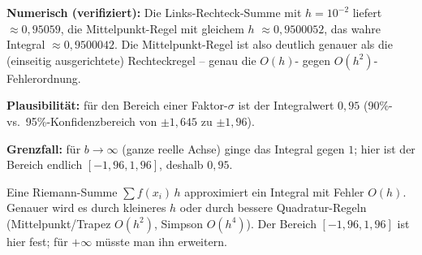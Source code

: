 \begin{kontrolle}
\textbf{Numerisch (verifiziert):} Die Links-Rechteck-Summe mit $h=10^{-2}$
liefert $\approx0{,}95059$, die Mittelpunkt-Regel mit gleichem $h$
$\approx0{,}9500052$, das wahre Integral $\approx0{,}9500042$. Die
Mittelpunkt-Regel ist also deutlich genauer als die (einseitig
ausgerichtete) Rechteckregel -- genau die $O(h)$- gegen
$O(h^2)$-Fehlerordnung. \checkmark

\textbf{Plausibilität:} für den Bereich einer Faktor-$\sigma$ ist der
Integralwert $0{,}95$ (90\%- vs.\ 95\%-Konfidenzbereich von
$\pm1{,}645$ zu $\pm1{,}96$). \checkmark

\textbf{Grenzfall:} für $b\to\infty$ (ganze reelle Achse) ginge das
Integral gegen $1$; hier ist der Bereich endlich $[-1{,}96,1{,}96]$,
deshalb $0{,}95$. \checkmark
\end{kontrolle}

\begin{merksatz}
Eine Riemann-Summe $\sum f(x_i)\,h$ approximiert ein Integral mit Fehler
$O(h)$. Genauer wird es durch kleineres $h$ oder durch bessere
Quadratur-Regeln (Mittelpunkt/Trapez $O(h^2)$, Simpson $O(h^4)$). Der
Bereich $[-1{,}96,1{,}96]$ ist hier fest; für $+\infty$ müsste man ihn
erweitern.
\end{merksatz}
